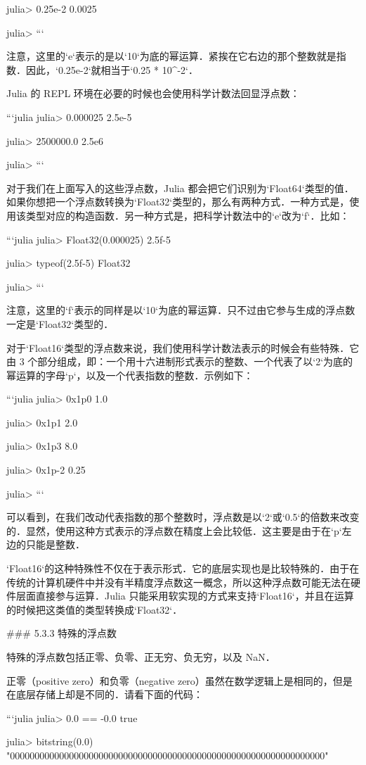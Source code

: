 julia> 0.25e-2
0.0025

julia> 
```

注意，这里的`e`表示的是以`10`为底的幂运算．紧挨在它右边的那个整数就是指数．因此，`0.25e-2`就相当于`0.25 * 10^-2`．

Julia 的 REPL 环境在必要的时候也会使用科学计数法回显浮点数：

```julia
julia> 0.000025
2.5e-5

julia> 2500000.0
2.5e6

julia> 
```

对于我们在上面写入的这些浮点数，Julia 都会把它们识别为`Float64`类型的值．如果你想把一个浮点数转换为`Float32`类型的，那么有两种方式．一种方式是，使用该类型对应的构造函数．另一种方式是，把科学计数法中的`e`改为`f`．比如：

```julia
julia> Float32(0.000025)
2.5f-5

julia> typeof(2.5f-5)
Float32

julia> 
```

注意，这里的`f`表示的同样是以`10`为底的幂运算．只不过由它参与生成的浮点数一定是`Float32`类型的．

对于`Float16`类型的浮点数来说，我们使用科学计数法表示的时候会有些特殊．它由 3 个部分组成，即：一个用十六进制形式表示的整数、一个代表了以`2`为底的幂运算的字母`p`，以及一个代表指数的整数．示例如下：

```julia
julia> 0x1p0
1.0

julia> 0x1p1
2.0

julia> 0x1p3
8.0

julia> 0x1p-2
0.25

julia> 
```

可以看到，在我们改动代表指数的那个整数时，浮点数是以`2`或`0.5`的倍数来改变的．显然，使用这种方式表示的浮点数在精度上会比较低．这主要是由于在`p`左边的只能是整数．

`Float16`的这种特殊性不仅在于表示形式．它的底层实现也是比较特殊的．由于在传统的计算机硬件中并没有半精度浮点数这一概念，所以这种浮点数可能无法在硬件层面直接参与运算．Julia 只能采用软实现的方式来支持`Float16`，并且在运算的时候把这类值的类型转换成`Float32`．

### 5.3.3 特殊的浮点数

特殊的浮点数包括正零、负零、正无穷、负无穷，以及 NaN．

正零（positive zero）和负零（negative zero）虽然在数学逻辑上是相同的，但是在底层存储上却是不同的．请看下面的代码：

```julia
julia> 0.0 == -0.0 
true

julia> bitstring(0.0)
"0000000000000000000000000000000000000000000000000000000000000000"

